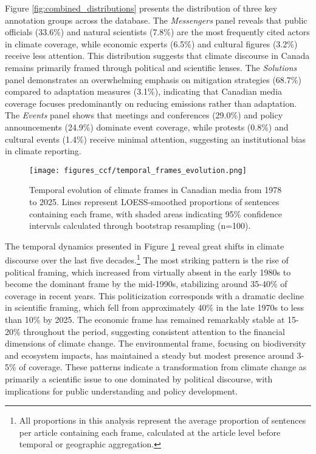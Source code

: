 \documentclass[12pt]{article}
\begin{document}
Figure \ref{fig:combined_distributions} presents the distribution of three key annotation groups across the database. The \emph{Messengers} panel reveals that public officials (33.6\%) and natural scientists (7.8\%) are the most frequently cited actors in climate coverage, while economic experts (6.5\%) and cultural figures (3.2\%) receive less attention. This distribution suggests that climate discourse in Canada remains primarily framed through political and scientific lenses. The \emph{Solutions} panel demonstrates an overwhelming emphasis on mitigation strategies (68.7\%) compared to adaptation measures (3.1\%), indicating that Canadian media coverage focuses predominantly on reducing emissions rather than adaptation. The \emph{Events} panel shows that meetings and conferences (29.0\%) and policy announcements (24.9\%) dominate event coverage, while protests (0.8\%) and cultural events (1.4\%) receive minimal attention, suggesting an institutional bias in climate reporting.

\begin{figure}[b!]
\centering
\texttt{[image: figures\_ccf/temporal\_frames\_evolution.png]}
\caption{Temporal evolution of climate frames in Canadian media from 1978 to 2025. Lines represent LOESS-smoothed proportions of sentences containing each frame, with shaded areas indicating 95\% confidence intervals calculated through bootstrap resampling (n=100).}
\label{fig:temporal_evolution}
\end{figure}

The temporal dynamics presented in Figure \ref{fig:temporal_evolution} reveal great shifts in climate discourse over the last five decades.\footnote{All proportions in this analysis represent the average proportion of sentences per article containing each frame, calculated at the article level before temporal or geographic aggregation.} The most striking pattern is the rise of political framing, which increased from virtually absent in the early 1980s to become the dominant frame by the mid-1990s, stabilizing around 35-40\% of coverage in recent years. This politicization corresponds with a dramatic decline in scientific framing, which fell from approximately 40\% in the late 1970s to less than 10\% by 2025. The economic frame has remained remarkably stable at 15-20\% throughout the period, suggesting consistent attention to the financial dimensions of climate change. The environmental frame, focusing on biodiversity and ecosystem impacts, has maintained a steady but modest presence around 3-5\% of coverage. These patterns indicate a transformation from climate change as primarily a scientific issue to one dominated by political discourse, with implications for public understanding and policy development.
\end{document}
